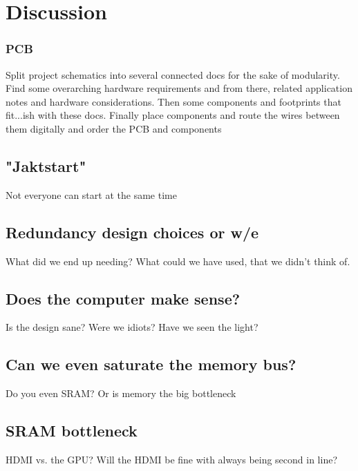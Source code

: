 \documentclass[../main/report.tex]{subfiles}
\begin{document}
\chapter{Discussion}



\subsection{PCB}
Split project schematics into several connected docs for the sake of modularity. Find some overarching hardware requirements and from there, related application notes and hardware considerations. Then some components and footprints that fit...ish with these docs.
Finally place components and route the wires between them digitally and order the PCB and components

\section{"Jaktstart"}

Not everyone can start at the same time

\section{Redundancy design choices or w/e}
What did we end up needing?
What could we have used, that we didn't think of.

\section{Does the computer make sense?}
Is the design sane?
Were we idiots?
Have we seen the light?

\section{Can we even saturate the memory bus?}
Do you even SRAM?
Or is memory the big bottleneck

\section{SRAM bottleneck}
HDMI vs. the GPU?
Will the HDMI be fine with always being second in line?
\end{document}
